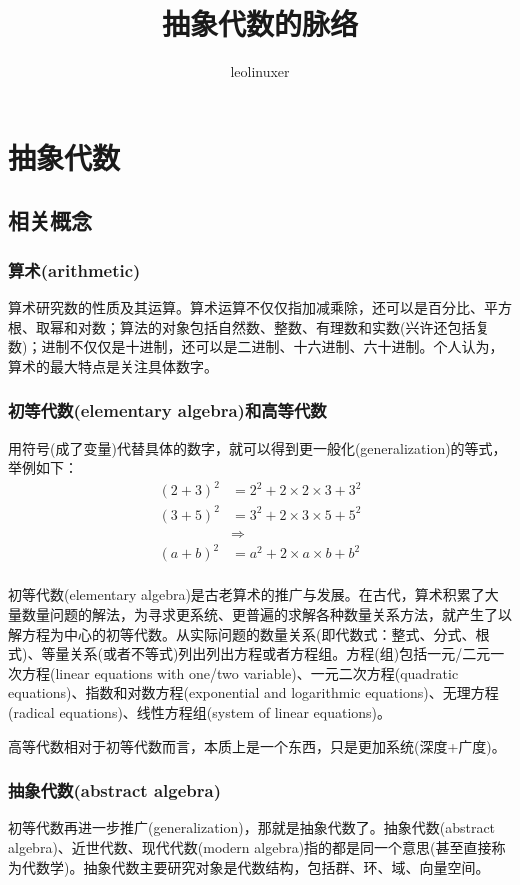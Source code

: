 \documentclass[12pt]{article}
\title{抽象代数的脉络\cite{Introduction_Of_Algebra_Structure}}
\author{leolinuxer}
\begin{document}
\maketitle
\tableofcontents

\section{抽象代数}
\subsection{相关概念}
\subsubsection{算术(arithmetic)}
算术研究数的性质及其运算。算术运算不仅仅指加减乘除，还可以是百分比、平方根、取幂和对数；算法的对象包括自然数、整数、有理数和实数(兴许还包括复数)；进制不仅仅是十进制，还可以是二进制、十六进制、六十进制。个人认为，算术的最大特点是关注具体数字。

\subsubsection{初等代数(elementary algebra)和高等代数}
用符号(成了变量)代替具体的数字，就可以得到更一般化(generalization)的等式，举例如下：
\begin{align*}
(2+3)^2 &= 2^2 + 2\times2\times3 + 3^2 \\
(3+5)^2 &= 3^2 + 2\times3\times5 + 5^2 \\
& \Rightarrow \\
(a+b)^2 &= a^2 + 2\times a \times b + b^2 \\
\end{align*}

初等代数(elementary algebra)是古老算术的推广与发展。在古代，算术积累了大量数量问题的解法，为寻求更系统、更普遍的求解各种数量关系方法，就产生了以解方程为中心的初等代数。从实际问题的数量关系(即代数式：整式、分式、根式)、等量关系(或者不等式)列出列出方程或者方程组。方程(组)包括一元/二元一次方程(linear equations with one/two variable)、一元二次方程(quadratic equations)、指数和对数方程(exponential and logarithmic equations)、无理方程(radical equations)、线性方程组(system of linear equations)。

高等代数相对于初等代数而言，本质上是一个东西，只是更加系统(深度+广度)。

\subsubsection{抽象代数(abstract algebra)}
初等代数再进一步推广(generalization)，那就是抽象代数了。抽象代数(abstract algebra)、近世代数、现代代数(modern algebra)指的都是同一个意思(甚至直接称为代数学)。抽象代数主要研究对象是代数结构，包括群、环、域、向量空间。
\end{document}
